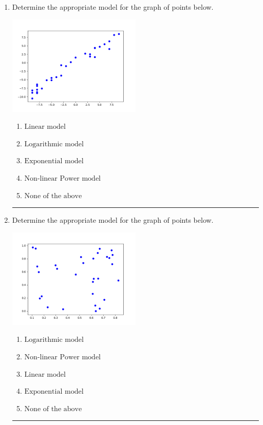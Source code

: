 \documentclass[14pt]{extbook}
\newcommand{\litem}[1]{\item#1\hspace*{-1cm}\rule{\textwidth}{0.4pt}}
\begin{document}
\begin{enumerate}
{\begin{enumerate}[label=\Alph*.]
\end{enumerate} }
\litem{
Determine the appropriate model for the graph of points below.
\begin{center}
    \includegraphics[width=0.5\textwidth]{../Figures/identifyModelGraph12CopyC.png}
\end{center}
\begin{enumerate}[label=\Alph*.]
\item \( \text{Linear model} \)
\item \( \text{Logarithmic model} \)
\item \( \text{Exponential model} \)
\item \( \text{Non-linear Power model} \)
\item \( \text{None of the above} \)

\end{enumerate} }
\litem{
Determine the appropriate model for the graph of points below.
\begin{center}
    \includegraphics[width=0.5\textwidth]{../Figures/identifyModelGraph12C.png}
\end{center}
\begin{enumerate}[label=\Alph*.]
\item \( \text{Logarithmic model} \)
\item \( \text{Non-linear Power model} \)
\item \( \text{Linear model} \)
\item \( \text{Exponential model} \)
\item \( \text{None of the above} \)


\end{enumerate}}
\end{enumerate}
\end{document}
